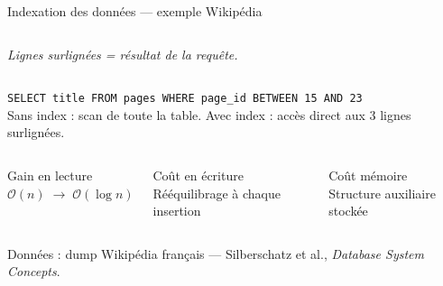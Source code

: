 \documentclass[a4paper,12pt]{beamer}
\begin{document}
\begin{frame}{Indexation des données — exemple Wikipédia}
\begin{columns}[T]
\vspace{0.1cm}
{\tiny\textit{Lignes surlignées = résultat de la requête.}}

\end{columns}

\vspace{0.2cm}

\begin{exampleblock}{}
  \centering\scriptsize
  \texttt{SELECT title FROM pages WHERE page\_id BETWEEN 15 AND 23}\\[3pt]
  Sans index : scan de toute la table. \quad
  Avec index : accès direct aux 3 lignes surlignées.
\end{exampleblock}

\vspace{0.15cm}

\begin{columns}[T]
  \begin{exampleblock}{\footnotesize Gain en lecture}
    \centering\scriptsize $\mathcal{O}(n) \;\to\; \mathcal{O}(\log n)$
  \end{exampleblock}
  \begin{alertblock}{\footnotesize Coût en écriture}
    \centering\scriptsize Rééquilibrage à chaque insertion
  \end{alertblock}
  \begin{alertblock}{\footnotesize Coût mémoire}
    \centering\scriptsize Structure auxiliaire stockée
  \end{alertblock}
\end{columns}

\vfill
{\tiny
Données : dump Wikipédia français —
Silberschatz et al., \textit{Database System Concepts}.
}
\end{frame}
\end{document}
